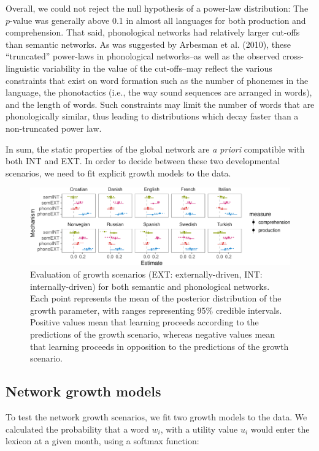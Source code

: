 \documentclass[english,floatsintext,man]{apa6}
\theoremstyle{definition}
\theoremstyle{definition}
\theoremstyle{definition}
\theoremstyle{remark}
\begin{document}
Overall, we could not reject the null hypothesis of a power-law
distribution: The \(p\)-value was generally above 0.1 in almost all
languages for both production and comprehension. That said, phonological
networks had relatively larger cut-offs than semantic networks. As was
suggested by Arbesman et al. (2010), these \enquote{truncated}
power-laws in phonological networks--as well as the observed
cross-linguistic variability in the value of the cut-offs--may reflect
the various constraints that exist on word formation such as the number
of phonemes in the language, the phonotactics (i.e., the way sound
sequences are arranged in words), and the length of words. Such
constraints may limit the number of words that are phonologically
similar, thus leading to distributions which decay faster than a
non-truncated power law.

In sum, the static properties of the global network are \emph{a priori}
compatible with both INT and EXT. In order to decide between these two
developmental scenarios, we need to fit explicit growth models to the
data.

\begin{figure}[!h]
\includegraphics[width=\textwidth]{ms_files/figure-latex/growthPred-1} \caption{Evaluation of growth scenarios (EXT: externally-driven, INT: internally-driven) for both semantic and phonological networks. Each point represents the mean of the posterior distribution of the growth parameter, with ranges representing 95\% credible intervals. Positive values mean that learning proceeds according to the predictions of the growth scenario, whereas negative values mean that learning proceeds in opposition to the predictions of the growth scenario.}\label{fig:growthPred}
\end{figure}

\subsection{Network growth models}\label{network-growth-models}

To test the network growth scenarios, we fit two growth models to the
data. We calculated the probability that a word \(w_i\), with a utility
value \(u_i\) would enter the lexicon at a given month, using a softmax
function:
\end{document}
